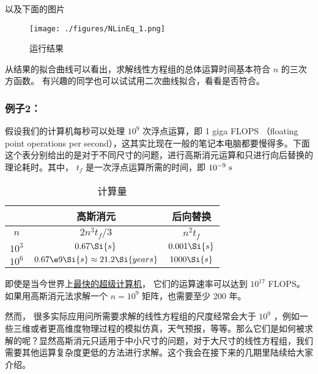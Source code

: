 以及下面的图片

\begin{figure}[ht]
\centering
\texttt{[image: ./figures/NLinEq\_1.png]}
\caption{运行结果} \label{NLinEq_fig1}
\end{figure}

从结果的拟合曲线可以看出，求解线性方程组的总体运算时间基本符合 $n$ 的三次方函数。 有兴趣的同学也可以试试用二次曲线拟合，看看是否符合。

\subsubsection{例子2：}

假设我们的计算机每秒可以处理 $10^9$ 次浮点运算，即 1 giga FLOPS （floating point operations per second），这其实比现在一般的笔记本电脑都要慢得多。下面这个表分别给出的是对于不同尺寸的问题，进行高斯消元运算和只进行向后替换的理论耗时。其中， $t_f$ 是一次浮点运算所需的时间，即 $10^{-9}~\rm{s}$ 

\begin{table}[ht]
\centering
\caption{计算量}\label{NLinEq_tab1}
\begin{tabular}{|c|c|c|}
\hline
 & 高斯消元 & 后向替换 \\
\hline
$n$ & $2n^3 t_f/3$ & $n^2 t_f$ \\
\hline
$10^3$ & $0.67\Si{s}$ & $0.001\Si{s}$ \\
\hline
$10^6$ & $0.67\e9\Si{s} \approx 21.2 \Si{years}$ & $1000\Si{s}$ \\
\hline
\end{tabular}
\end{table}

即使是当今世界上\href{https://www.top500.org}{最快的超级计算机}， 它们的运算速率可以达到 $10^{17}$ FLOPS。 如果用高斯消元法求解一个 $n=10^9$ 矩阵，也需要至少 200 年。

然而， 很多实际应用问所需要求解的线性方程组的尺度经常会大于 $10^9$ ，例如一些三维或者更高维度物理过程的模拟仿真，天气预报，等等。那么它们是如何被求解的呢？显然高斯消元只适用于中小尺寸的问题，对于大尺寸的线性方程组，我们需要其他运算复杂度更低的方法进行求解。这个我会在接下来的几期里陆续给大家介绍。
